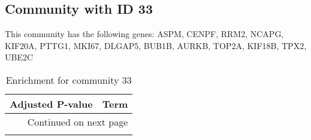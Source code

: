 \subsection*{Community with ID 33}
This community has the following genes: ASPM, CENPF, RRM2, NCAPG, KIF20A, PTTG1, MKI67, DLGAP5, BUB1B, AURKB, TOP2A, KIF18B, TPX2, UBE2C
\\
\begin{longtable}{p{2.4cm}p{14.5cm}}
\caption{Enrichment for community 33}\\
\toprule
Adjusted \newline P-value &                                                                                                                                                   Term \\
\midrule
\endhead
\midrule
\multicolumn{2}{r}{{Continued on next page}} \\
\midrule
\endfoot


\end{longtable}
